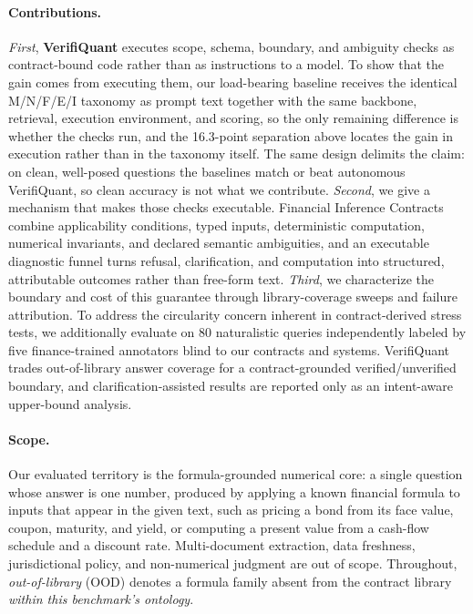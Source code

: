 \documentclass[sigconf,anonymous]{acmart}
\newcommand{\govGap}{16.3}                %
\begin{document}
\paragraph{Contributions.}
\emph{First}, \textbf{VerifiQuant} executes scope, schema, boundary, and ambiguity checks as contract-bound code rather than as instructions to a model. To show that the gain comes from executing them, our load-bearing baseline receives the identical M/N/F/E/I taxonomy as prompt text together with the same backbone, retrieval, execution environment, and scoring, so the only remaining difference is whether the checks run, and the \govGap{}-point separation above locates the gain in execution rather than in the taxonomy itself. The same design delimits the claim: on clean, well-posed questions the baselines match or beat autonomous VerifiQuant, so clean accuracy is not what we contribute.
\emph{Second}, we give a mechanism that makes those checks executable. Financial Inference Contracts combine applicability conditions, typed inputs, deterministic computation, numerical invariants, and declared semantic ambiguities, and an executable diagnostic funnel turns refusal, clarification, and computation into structured, attributable outcomes rather than free-form text.
\emph{Third}, we characterize the boundary and cost of this guarantee through library-coverage sweeps and failure attribution. To address the circularity concern inherent in contract-derived stress tests, we additionally evaluate on 80 naturalistic queries independently labeled by five finance-trained annotators blind to our contracts and systems. VerifiQuant trades out-of-library answer coverage for a contract-grounded verified/unverified boundary, and clarification-assisted results are reported only as an intent-aware upper-bound analysis.

\paragraph{Scope.} Our evaluated territory is the formula-grounded numerical core: a single question whose answer is one number, produced by applying a known financial formula to inputs that appear in the given text, such as pricing a bond from its face value, coupon, maturity, and yield, or computing a present value from a cash-flow schedule and a discount rate.
Multi-document extraction, data freshness, jurisdictional policy, and non-numerical judgment are out of scope.
Throughout, \emph{out-of-library} (OOD) denotes a formula family absent from the contract library \emph{within this benchmark's ontology}.
\end{document}
